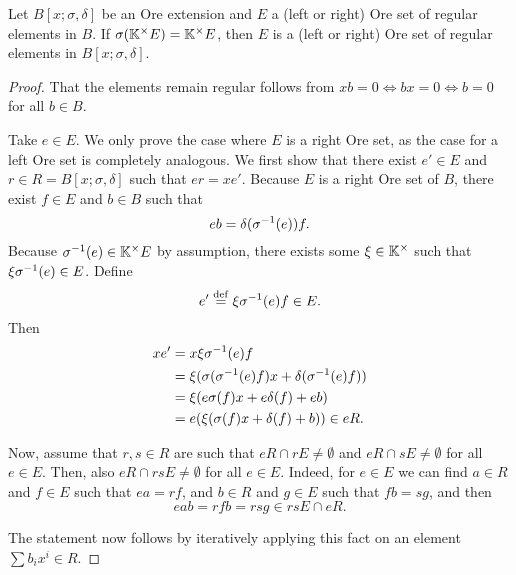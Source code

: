 \begin{lemma}\label{lem:ore_set_ore_extension}
	Let $B[x;\sigma,\delta]$ be an Ore extension and $E$ a (left or right) Ore set of
	regular elements in $B$. If $\sigma(\mathbb{K}^\times E) = \mathbb{K}^\times E$, then $E$ is a
	(left or right) Ore set of regular elements in $B[x;\sigma, \delta]$.
\end{lemma}
\begin{proof}
	That the elements remain regular follows from $x b = 0 \iff b x = 0 \iff b = 0$ for all
	$b \in B$.

	Take $e \in E$. We only prove the case where $E$ is a right Ore set, as the case for a
	left Ore set is completely analogous. We first show that there exist $e' \in E$ and $r
		\in R = B[x; \sigma, \delta]$ such that $er = x e'$. Because $E$ is a right Ore set of
	$B$, there exist $f\in E$ and $b \in B$ such that
	\begin{equation*}
		e b = \delta(\sigma^{-1}(e))f.
	\end{equation*}
	Because $\sigma^{-1}(e) \in \mathbb{K}^\times E$ by assumption, there exists some $\xi \in \mathbb{K}^\times$ such that $\xi \sigma^{-1}(e) \in E$.
	Define
	\begin{equation*}
		e' \overset{\mathrm{def}}{=} \xi \sigma^{-1}(e)f \in E.
	\end{equation*}
	Then
	\begin{align*}
		xe' & = x\xi\sigma^{-1}(e)f                                     \\
		    & = \xi (\sigma(\sigma^{-1}(e)f)x + \delta(\sigma^{-1}(e)f)) \\
		    & = \xi(e\sigma(f)x + e \delta(f) + e b)                   \\
		    & = e(\xi (\sigma(f)x + \delta(f) + b)) \in eR.
	\end{align*}

	Now, assume that $r,s \in R$ are such that $e R \cap r E \neq \emptyset$ and $e R \cap
		s E \neq \emptyset$ for all $e \in E$. Then, also $e R \cap rs E \neq \emptyset$ for
	all $e\in E$. Indeed, for $e \in E$ we can find $a \in R$ and $f \in E$ such that $ea =
		r f$, and $b \in R$ and $g \in E$ such that $f b = s g$, and then
	\begin{equation*}
		e a b = r f b = r s g \in rs E \cap e R.
	\end{equation*}

	The statement now follows by iteratively applying this fact on an element $\sum b_i x^i
		\in R$.
\end{proof}

